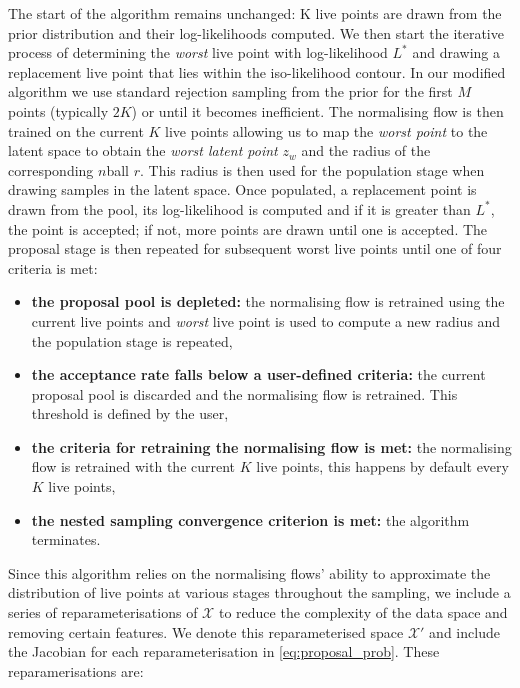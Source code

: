 \documentclass[%
 reprint,
nofootinbib,
 amsmath,amssymb,
 aps,
 prd,
]{revtex4-2}
\newcommand{\nball}[1]{$#1$\nobreakdash\discretionary{-}{-}{-}ball }
\newcommand{\physical}{\mathcal{X}}
\begin{document}
The start of the algorithm remains unchanged: K live points are drawn from the prior distribution and their log-likelihoods computed. We then start the iterative process of determining the \textit{worst} live point with log-likelihood $L^{*}$ and drawing a replacement live point that lies within the iso-likelihood contour. In our modified algorithm we use standard rejection sampling from the prior for the first $M$ points (typically $2K$) or until it becomes inefficient. The normalising flow is then trained on the current $K$ live points allowing us to map the \textit{worst point} to the latent space to obtain the \textit{worst latent point} $z_{w}$ and the radius of the corresponding \nball{n} $r$. This radius is then used for the population stage when drawing samples in the latent space. Once populated, a replacement point is drawn from the pool, its log-likelihood is computed and if it is greater than $L^{*}$, the point is accepted; if not, more points are drawn until one is accepted. The proposal stage is then repeated for subsequent worst live points until one of four criteria is met:

\begin{itemize}
    \item {\textbf{the proposal pool is depleted:} the normalising flow is retrained using the current live points and  \textit{worst} live point is used to compute a new radius and the population stage is repeated,}
    \item {\textbf{the acceptance rate falls below a user-defined criteria:} the current proposal pool is discarded and the normalising flow is retrained. This threshold is defined by the user,}
    \item {\textbf{the criteria for retraining the normalising flow is met:} the normalising flow is retrained with the current $K$ live points, this happens by default every $K$ live points,}
    \item {\textbf{the nested sampling convergence criterion is met:} the algorithm terminates.}
\end{itemize}

Since this algorithm relies on the normalising flows' ability to approximate the distribution of live points at various stages throughout the sampling, we include a series of reparameterisations of $\physical$ to reduce the complexity of the data space and removing certain features. We denote this reparameterised space $\physical'$ and include the Jacobian for each reparameterisation in \cref{eq:proposal_prob}. These reparamerisations are:
\end{document}
